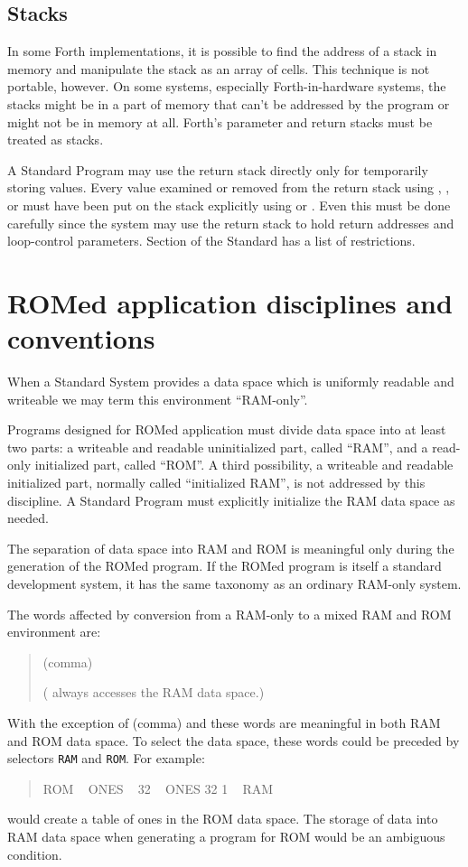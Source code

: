 \subsection{Stacks} %

In some Forth implementations, it is possible to find the address of
a stack in memory and manipulate the stack as an array of cells. This
technique is not portable, however. On some systems, especially
Forth-in-hardware systems, the stacks might be in a part of memory
that can't be addressed by the program or might not be in memory at
all. Forth's parameter and return stacks must be treated as stacks.

A Standard Program may use the return stack directly only for
temporarily storing values. Every value examined or removed from the
return stack using , , or  must have been
put on the stack explicitly using  or . Even this
must be done carefully since the system may use the return stack to
hold return addresses and loop-control parameters. Section
 of the Standard has a
list of restrictions.


\section{ROMed application disciplines and conventions} %

When a Standard System provides a data space which is uniformly
readable and writeable we may term this environment ``RAM-only''.

Programs designed for ROMed application must divide data space into
at least two parts: a writeable and readable uninitialized part,
called ``RAM'', and a read-only initialized part, called ``ROM''.
A third possibility, a writeable and readable initialized part,
normally called ``initialized RAM'', is not addressed by this
discipline. A Standard Program must explicitly initialize the RAM
data space as needed.

The separation of data space into RAM and ROM is meaningful only
during the generation of the ROMed program. If the ROMed program is
itself a standard development system, it has the same taxonomy as an
ordinary RAM-only system.

The words affected by conversion from a RAM-only to a mixed RAM and
ROM environment are:
\begin{quote}
	\word{,} (comma) ~  ~  ~  ~
	 ~  ~  ~ 

	( always accesses the RAM data space.)
\end{quote}
With the exception of \word{,} (comma) and  these words are
meaningful in both RAM and ROM data space. To select the data space,
these words could be preceded by selectors \texttt{RAM} and
\texttt{ROM}. For example:
\begin{quote}\ttfamily
	ROM ~  ONES ~ 32  ~ ONES 32 1  ~ RAM
\end{quote}
would create a table of ones in the ROM data space. The storage of
data into RAM data space when generating a program for ROM would be
an ambiguous condition.

